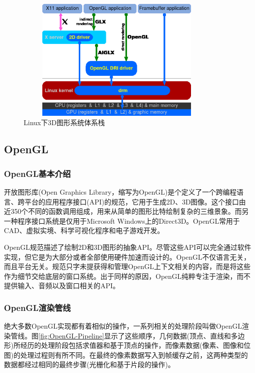 \begin{figure}[H] 
  \centering
  \includegraphics[width=10cm,height=6cm]{figures/chap01/OpenGL_With_Direct_Rendering}
  \caption{Linux下3D图形系统体系栈}
  \label{fig:OpenGL_With_Direct_Rendering}
\end{figure}



\subsection{OpenGL}

\subsubsection{OpenGL基本介绍}
开放图形库(Open Graphics Library，缩写为OpenGL)是个定义了一个跨编程语言、跨平台的应用程序接口(API)的规范，它用于生成2D、3D图像。这个接口由近350个不同的函数调用组成，用来从简单的图形比特绘制复杂的三维景象。而另一种程序接口系统是仅用于Microsoft Windows上的Direct3D。OpenGL常用于CAD、虚拟实境、科学可视化程序和电子游戏开发。

OpenGL规范描述了绘制2D和3D图形的抽象API。尽管这些API可以完全通过软件实现，但它是为大部分或者全部使用硬件加速而设计的。OpenGL不仅语言无关，而且平台无关。规范只字未提获得和管理OpenGL上下文相关的内容，而是将这些作为细节交给底层的窗口系统。出于同样的原因，OpenGL纯粹专注于渲染，而不提供输入、音频以及窗口相关的API。

\subsubsection{OpenGL渲染管线}

绝大多数OpenGL实现都有着相似的操作，一系列相关的处理阶段叫做OpenGL渲染管线。图\ref{fig:OpenGL-Pipeline}显示了这些顺序，几何数据(顶点、直线和多边形)所经历的处理阶段包括求值器和基于顶点的操作，而像素数据(像素、图像和位图)的处理过程则有所不同。在最终的像素数据写入到帧缓存之前，这两种类型的数据都经过相同的最终步骤(光栅化和基于片段的操作)\cite{OpenGL-Programming-Guide}。

